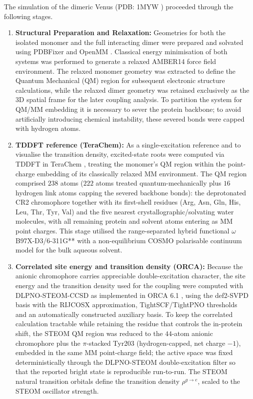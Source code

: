 \documentclass[journal=jpcbfk, manuscript=article, layout=twocolumn, doi=true]{achemso}
\begin{document}
The simulation of the dimeric Venus (PDB: 1MYW \cite{berman2000protein}) proceeded through the following stages.

\begin{enumerate}
    \item \textbf{Structural Preparation and Relaxation:} Geometries for both the isolated monomer and the full interacting dimer were prepared and solvated using PDBFixer \cite{openmm2017} and OpenMM \cite{openmm2017}. Classical energy minimisation of both systems was performed to generate a relaxed AMBER14 \cite{amber14_manual} force field environment. The relaxed monomer geometry was extracted to define the Quantum Mechanical (QM) region for subsequent electronic structure calculations, while the relaxed dimer geometry was retained exclusively as the 3D spatial frame for the later coupling analysis. To partition the system for QM/MM embedding it is necessary to sever the protein backbone; to avoid artificially introducing chemical instability, these severed bonds were capped with hydrogen atoms.

    \item \textbf{TDDFT reference (TeraChem):} As a single-excitation reference and to visualise the transition density, excited-state roots were computed via TDDFT in TeraChem \cite{terachem2009,seritan2021terachem}, treating the monomer's QM region within the point-charge embedding of its classically relaxed MM environment. The QM region comprised $238$ atoms ($222$ atoms treated quantum-mechanically plus $16$ hydrogen link atoms capping the severed backbone bonds): the deprotonated CR2 chromophore together with its first-shell residues (Arg, Asn, Gln, His, Leu, Thr, Tyr, Val) and the five nearest crystallographic/solvating water molecules, with all remaining protein and solvent atoms entering as MM point charges. This stage utilised the range-separated hybrid functional $\omega$B97X-D3/6-311G** \cite{mardirossian2017} with a non-equilibrium COSMO polarisable continuum model \cite{klamt1993cosmo} for the bulk aqueous solvent.

    \item \textbf{Correlated site energy and transition density (ORCA):} Because the anionic chromophore carries appreciable double-excitation character, the site energy and the transition density used for the coupling were computed with DLPNO-STEOM-CCSD \cite{nooijen1997steom,dutta2016dlpno,dutta2018ipeom,dutta2019eaeom,riplinger2013dlpno} as implemented in ORCA 6.1 \cite{neese2020orca,neese2022orca}, using the def2-SVPD basis \cite{weigend2005def2,rappoport2010svpd} with the RIJCOSX approximation, TightSCF/TightPNO thresholds and an automatically constructed auxiliary basis. To keep the correlated calculation tractable while retaining the residue that controls the in-protein shift, the STEOM QM region was reduced to the $44$-atom anionic chromophore plus the $\pi$-stacked Tyr203 (hydrogen-capped, net charge $-1$), embedded in the same MM point-charge field; the active space was fixed deterministically through the DLPNO-STEOM double-excitation filter so that the reported bright state is reproducible run-to-run. The STEOM natural transition orbitals define the transition density $\rho^{g\to e}$, scaled to the STEOM oscillator strength.


\end{enumerate}
\end{document}
